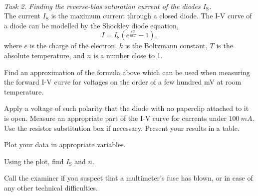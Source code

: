 \documentclass[../TST.tex]{subfiles}
\begin{document}
\begin{eproblem}{\ \\[5pt]}
\textit{Task 2. Finding the reverse-bias saturation current of the diodes $I_\mathrm{S}$.}\\
The current $I_\mathrm{S}$ is the maximum current through a closed diode. The I-V curve of a diode can be modelled by the Shockley diode equation,
\begin{equation*}
	I=I_\mathrm{S}\left(e^{\frac{eU}{nkT}}-1\right)
,
\end{equation*}
where $e$ is the charge of the electron, $k$ is the Boltzmann constant, $T$ is the absolute temperature, and $n$ is a number close to 1.

\begin{subpart}
	\item Find an approximation of the formula above which can be used when measuring the forward I-V curve for voltages on the order of a few hundred mV at room temperature.
	\item Apply a voltage of such polarity that the diode with no paperclip attached to it is open. Measure an appropriate part of the I-V curve for currents under $\qty{100}{mA}$. Use the resistor substitution box if necessary. Present your results in a table.
	\item Plot your data in appropriate variables.
	\item Using the plot, find $I_\mathrm{S}$ and $n$.
\end{subpart}
Call the examiner if you suspect that a multimeter's fuse has blown, or in case of any other technical difficulties.
\end{eproblem}
\end{document}
